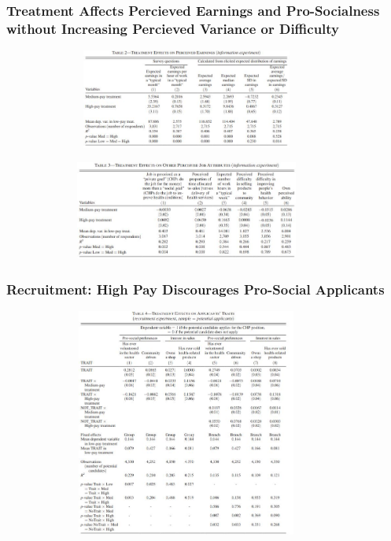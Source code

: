 \documentclass{beamer}
\begin{document}
\begin{frame}
\frametitle{Treatment Affects Percieved Earnings and Pro-Socialness without Increasing Percieved Variance or Difficulty}
\begin{figure}
    \includegraphics[width=10cm,height=3.25cm]{Deserranno_Table2} 
     \end{figure}
\begin{figure}
    \includegraphics[width=10cm,height=3.25cm]{Deserranno_Table3} 
     \end{figure}



\end{frame}


\begin{frame}
\frametitle{Recruitment: High Pay Discourages Pro-Social Applicants}
\begin{figure}
    \includegraphics[width=10cm,height=7.5cm]{Deserranno_Table4} 
     \end{figure}






\end{frame}
\end{document}
